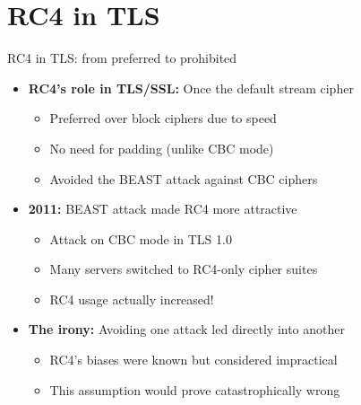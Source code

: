 \documentclass[aspectratio=169, lualatex, handout]{beamer}
\begin{document}
\section{RC4 in TLS}

\begin{frame}{RC4 in TLS: from preferred to prohibited}
	\begin{itemize}
		\item \textbf{RC4's role in TLS/SSL:} Once the default stream cipher
		      \begin{itemize}
			      \item Preferred over block ciphers due to speed
			      \item No need for padding (unlike CBC mode)
			      \item Avoided the BEAST attack against CBC ciphers
		      \end{itemize}
		\item \textbf{2011:} BEAST attack made RC4 more attractive
		      \begin{itemize}
			      \item Attack on CBC mode in TLS 1.0
			      \item Many servers switched to RC4-only cipher suites
			      \item RC4 usage actually increased!
		      \end{itemize}
		\item \textbf{The irony:} Avoiding one attack led directly into another
		      \begin{itemize}
			      \item RC4's biases were known but considered impractical
			      \item This assumption would prove catastrophically wrong
		      \end{itemize}
	\end{itemize}
\end{frame}
\end{document}
